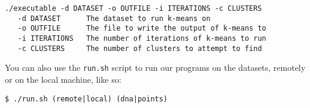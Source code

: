 \documentclass[12pt]{article}
\begin{document}
\begin{verbatim}
./executable -d DATASET -o OUTFILE -i ITERATIONS -c CLUSTERS
   -d DATASET      The dataset to run k-means on
   -o OUTFILE      The file to write the output of k-means to
   -i ITERATIONS   The number of iterations of k-means to run
   -c CLUSTERS     The number of clusters to attempt to find
\end{verbatim}

You can also use the \texttt{run.sh} script to run our programs on the
datasets, remotely or on the local machine, like so:

\begin{verbatim}
$ ./run.sh (remote|local) (dna|points)
\end{verbatim}
\end{document}
